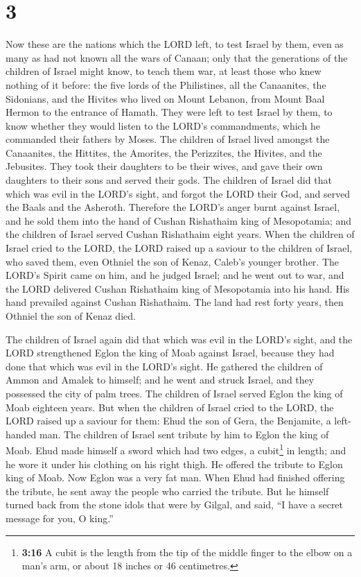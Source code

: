 \hypertarget{section-2}{%
\section{3}\label{section-2}}

 Now these are the nations which the LORD left, to test
Israel by them, even as many as had not known all the wars of Canaan;
 only that the generations of the children of Israel might
know, to teach them war, at least those who knew nothing of it before:
 the five lords of the Philistines, all the Canaanites,
the Sidonians, and the Hivites who lived on Mount Lebanon, from Mount
Baal Hermon to the entrance of Hamath.  They were left to
test Israel by them, to know whether they would listen to the LORD's
commandments, which he commanded their fathers by Moses. 
The children of Israel lived amongst the Canaanites, the Hittites, the
Amorites, the Perizzites, the Hivites, and the Jebusites. 
They took their daughters to be their wives, and gave their own
daughters to their sons and served their gods.  The
children of Israel did that which was evil in the LORD's sight, and
forgot the LORD their God, and served the Baals and the Asheroth.
 Therefore the LORD's anger burnt against Israel, and he
sold them into the hand of Cushan Rishathaim king of Mesopotamia; and
the children of Israel served Cushan Rishathaim eight years.
 When the children of Israel cried to the LORD, the LORD
raised up a saviour to the children of Israel, who saved them, even
Othniel the son of Kenaz, Caleb's younger brother.  The
LORD's Spirit came on him, and he judged Israel; and he went out to war,
and the LORD delivered Cushan Rishathaim king of Mesopotamia into his
hand. His hand prevailed against Cushan Rishathaim.  The
land had rest forty years, then Othniel the son of Kenaz died.

 The children of Israel again did that which was evil in
the LORD's sight, and the LORD strengthened Eglon the king of Moab
against Israel, because they had done that which was evil in the LORD's
sight.  He gathered the children of Ammon and Amalek to
himself; and he went and struck Israel, and they possessed the city of
palm trees.  The children of Israel served Eglon the king
of Moab eighteen years.  But when the children of Israel
cried to the LORD, the LORD raised up a saviour for them: Ehud the son
of Gera, the Benjamite, a left-handed man. The children of Israel sent
tribute by him to Eglon the king of Moab.  Ehud made
himself a sword which had two edges, a cubit\footnote{\textbf{3:16} A
  cubit is the length from the tip of the middle finger to the elbow on
  a man's arm, or about 18 inches or 46 centimetres.} in length; and he
wore it under his clothing on his right thigh.  He
offered the tribute to Eglon king of Moab. Now Eglon was a very fat man.
 When Ehud had finished offering the tribute, he sent
away the people who carried the tribute.  But he himself
turned back from the stone idols that were by Gilgal, and said, ``I have
a secret message for you, O king.''

